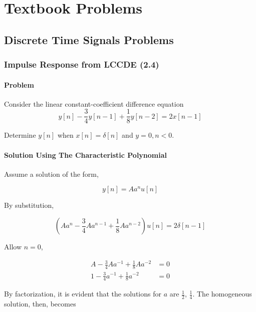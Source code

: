 \chapter{Textbook Problems}

\section{Discrete Time Signals Problems}
\subsection{Impulse Response from LCCDE (2.4)}
\subsubsection{Problem}
Consider the linear constant-coefficient difference equation
\begin{equation}
    y[n] - \frac{3}{4} y[n-1] + \frac{1}{8} y[n-2] = 2x[n-1]
\end{equation}

Determine $y[n]$ when $x[n] = \delta[n]$ and $y=0,  n < 0$.

\subsubsection{Solution Using The Characteristic Polynomial}

Assume a solution of the form,

\begin{equation}
    y[n] = A a^n u[n]
\end{equation}

By substitution,

\begin{equation}
\left( {A{a^n} - \frac{3}{4}A{a^{n - 1}} + \frac{1}{8}A{a^{n - 2}}} \right)u[n] = 2\delta [n - 1]
\end{equation}

Allow $n=0$,

\begin{equation}
    \begin{aligned}
        A - \frac{3}{4}A{a^{ - 1}} + \frac{1}{8}A{a^{ - 2}} &= 0\\
        1 - \frac{3}{4}{a^{ - 1}} + \frac{1}{8}{a^{ - 2}} &= 0
        \end{aligned}
\end{equation}

By factorization, it is evident that the solutions for $a$ are $\frac{1}{2}$, $\frac{1}{4}$. 
The homogeneous solution, then, becomes


